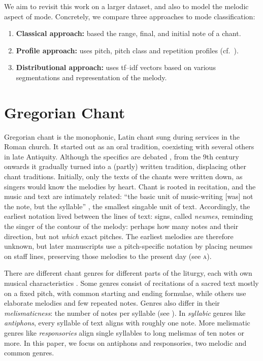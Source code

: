 \documentclass{article}
\begin{document}
We aim to revisit this work on a larger dataset, and also to model the melodic aspect of mode. 
Concretely, we compare three approaches to mode classification:
\begin{enumerate}[noitemsep]
    \item \textbf{Classical approach:} based the range, final, and initial note of a chant.
    \item \textbf{Profile approach:} uses pitch, pitch class and repetition profiles (cf.~\cite{Huron2006a}).
    \item \textbf{Distributional approach:} uses tf--idf vectors based on various segmentations and representation of the melody.
\end{enumerate}



\section{Gregorian Chant}



Gregorian chant is the monophonic, Latin chant sung during services in the Roman church.
It started out as an oral tradition, coexisting with several others in late Antiquity.
Although the specifics are debated \cite[ch.~2]{Jeffery1992}, from the 9th century onwards it gradually turned into a (partly) written tradition, displacing other chant traditions.
Initially, only the texts of the chants were written down, as singers would know the melodies by heart. 
Chant is rooted in recitation, and the music and text are intimately related: ``the basic unit of music-writing [was] not the note, but the syllable'' \cite{Kelly2018}, the smallest singable unit of text.
Accordingly, the earliest notation lived between the lines of text: signs, called \emph{neumes}, reminding the singer of the contour of the melody: perhaps how many notes and their direction, but not \emph{which} exact pitches.
The earliest melodies are therefore unknown, but later manuscripts use a pitch-specific notation by placing neumes on staff lines, preserving those melodies to the present day (see \textsc{a}).



There are different chant genres for different parts of the liturgy, each with own musical characteristics \cite{Hiley2009}.
Some genres consist of recitations of a sacred text mostly on a fixed pitch, with common starting and ending formulae, while others use elaborate melodies and few repeated notes. 
Genres also differ in their \emph{melismaticness}: the number of notes per syllable (see ).
In \emph{syllabic} genres like \emph{antiphons}, every syllable of text aligns with roughly one note.
More melismatic genres like \emph{responsories} align single syllables to long melismas of ten notes or more. 
In this paper, we focus on antiphons and responsories, two melodic and common genres.
\end{document}
